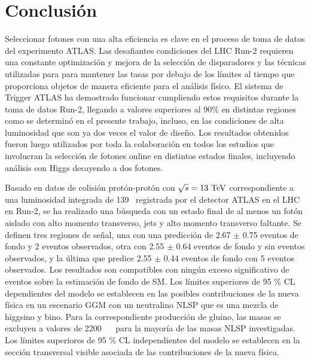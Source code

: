 \chapter{Conclusión}

Seleccionar fotones con una alta eficiencia es clave en el proceso de toma de datos del experimento ATLAS. Las desafiantes condiciones del LHC Run-2 requieren una constante optimización y mejora de la selección de disparadores y las técnicas utilizadas para para mantener las tasas por debajo de los límites al tiempo que proporciona objetos de manera eficiente para el análisis físico. El sistema de Trigger ATLAS ha demostrado funcionar cumpliendo estos requisitos durante la toma de datos Run-2, llegando a valores superiores al 90\% en distintas regiones como se determinó en el presente trabajo, incluso, en las condiciones de alta luminosidad que son ya dos veces el valor de diseño. Los resultados obtenidos fueron luego utilizados por toda la colaboración en todos los estudios que involucran la selección de fotones online en distintos estados finales, incluyendo análisis con Higgs decayendo a dos fotones. 

Basado en datos de colisión protón-protón con $\sqrt{s}=13\ \text{TeV}$ correspondiente a una luminosidad integrada de 139 \ifb\ registrada por el detector ATLAS
en el LHC en Run-2, se ha realizado una búsqueda con un estado final de al menos un fotón aislado con alto momento transverso, jets y alto momento transverso faltante. Se definen tres regiones de señal, una con una predicción de 2.67 $\pm$ 0.75 eventos de fondo y 2 eventos observados, otra con 2.55 $\pm$ 0.64 eventos de fondo y sin eventos observados, y la última que predice 2.55 $\pm$ 0.44 eventos de fondo con 5 eventos observados.
Los resultados son compatibles con ningún exceso significativo de eventos sobre la estimación de fondo de SM. Los límites superiores de 95 \% CL dependientes del modelo se establecen en las posibles contribuciones de la nueva física en un escenario GGM con un neutralino NLSP que es una mezcla de higgsino y bino. Para la correspondiente producción de gluino, las masas se excluyen a valores de 2200 ~ \gev\ para la mayoría de las masas NLSP investigadas. Los límites superiores de 95 \% CL independientes del modelo se establecen en la sección transversal visible asociada de las contribuciones de la nueva física.


